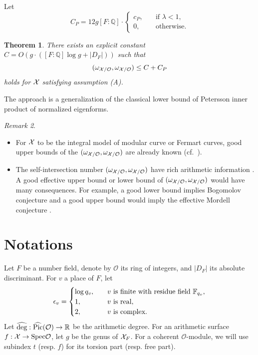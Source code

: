 \documentclass[]{amsart}
\newcommand{\BQ}{{\mathbb {Q}}} \newcommand{\BR}{{\mathbb {R}}}
\newcommand{\CO}{{\mathcal {O}}} \newcommand{\CP}{{\mathcal {P}}}
\newcommand{\Spec}{{\mathrm{Spec}}} \newcommand{\Spf}{{\mathrm{Spf}}}
\newcommand{\wh}{\widehat}
\newcommand{\ra}{\rightarrow} \newcommand{\imp}{\Longrightarrow}
\theoremstyle{plain}
\newtheorem{thm}{Theorem}[section] \newtheorem{cor}[thm]{Corollary}
\theoremstyle{remark} \newtheorem{remark}[thm]{Remark}
\theoremstyle{remark} \newtheorem{exercise}{Exercise}
\theoremstyle{remark} \newtheorem{example}{Example}
\numberwithin{equation}{section}
\begin{document}
Let \[C_P=12g[F:\BQ]\cdot \begin{cases}
 c_P,&\quad \text{if $\lambda< 1$},\\
 0,&\quad \text{otherwise}.
\end{cases}
\]
\begin{thm}\label{mainthm}There exists an explicit constant 
$C=O(g\cdot([F:\BQ]\log g +|D_F|))
$ such that 
\[(\omega_{\CX/\CO},\omega_{\CX/\CO})\leq C+C_{P}\]holds for ${\mathcal {X}}$ satisfying assumption (A). 
\end{thm}





The approach is a generalization of the classical lower bound of Petersson inner product of normalized eigenforms. 
\begin{remark}\
  \begin{itemize}
    \item [(i)]For ${\mathcal {X}}$ to be the integral model of modular curve or Fermart curves, good upper bounds of the $(\omega_{\CX/\CO},\omega_{\CX/\CO})$ are already known (cf.~\cite{Abbes-Ullmo, Michel-Ullmo, Kuhn, Curilla-Kuhn}). 
    \item [(ii)]The self-intersection number $(\omega_{\CX/\CO},\omega_{\CX/\CO})$ have rich arithmetic information \cite{Gasbarri}. A good effective upper bound or lower bound of $(\omega_{\CX/\CO},\omega_{\CX/\CO})$ would have many consequences. For example, a good lower bound implies Bogomolov conjecture \cite{Zhang:1993} and a good upper bound would imply the effective Mordell conjecture \cite{Parshin:1988, Soule, Vojta}.
  \end{itemize}




\end{remark}






\section*{Notations}

Let $F$ be a number field, denote by $\CO$ its ring of integers, and $|D_F|$ its absolute discriminant.
For $v$ a place of $F$, let
\[\epsilon_v=\begin{cases}
  \log q_v,&\quad  v\ \text{is finite with residue field ${\mathbb {F}}_{q_v}$},\\
  1,&\quad \text{$v$ is real},\\
  2,&\quad \text{$v$ is complex}.\\
\end{cases}\]
Let $\wh{\deg}:\wh{\Pic}(\CO)\ra \BR$ be the arithmetic degree.
For an arithmetic surface $f:\CX\ra \Spec\CO$, let $g$ be the genus of ${\mathcal {X}}_F$.
For a coherent $\CO$-module, we will use subindex $t$ (resp. $f$) for its torsion part (resp. free part). 
\end{document}
